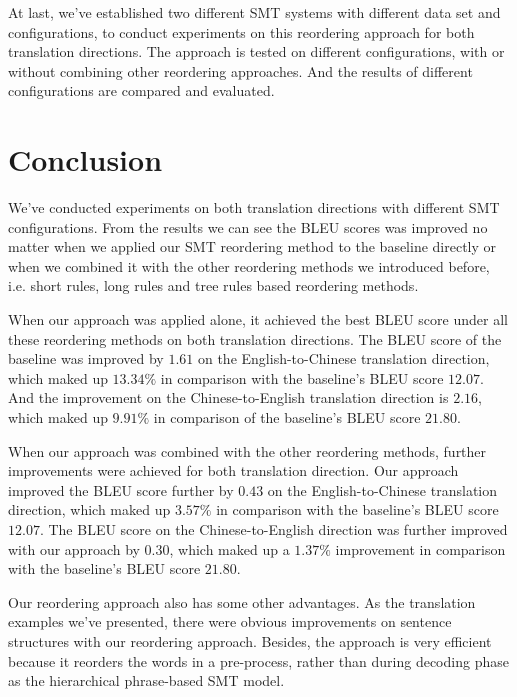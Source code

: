 At last, we've established two different \ac{SMT} systems with different data set and configurations, to conduct experiments on this reordering approach for both translation directions. The approach is tested on different configurations, with or without combining other reordering approaches. And the results of different configurations are compared and evaluated.

\section{Conclusion}
\label{ch:Discussion:sec:Conclusion}

We've conducted experiments on both translation directions with different \ac{SMT} configurations. From the results we can see the \ac{BLEU} scores was improved no matter when we applied our \ac{SMT} reordering method to the baseline directly or when we combined it with the other reordering methods we introduced before, i.e. short rules, long rules and tree rules based reordering methods.

When our approach was applied alone, it achieved the best \ac{BLEU} score under all these reordering methods on both translation directions. The \ac{BLEU} score of the baseline was improved by $1.61$ on the English-to-Chinese translation direction, which maked up $13.34\%$ in comparison with the baseline's \ac{BLEU} score $12.07$. And the improvement on the Chinese-to-English translation direction is $2.16$, which maked up $9.91\%$ in comparison of the baseline's \ac{BLEU} score $21.80$.

When our approach was combined with the other reordering methods, further improvements were achieved for both translation direction. Our approach improved the \ac{BLEU} score further by $0.43$ on the English-to-Chinese translation direction, which maked up $3.57\%$ in comparison with the baseline's \ac{BLEU} score $12.07$. The \ac{BLEU} score on the Chinese-to-English direction was further improved with our approach by $0.30$, which maked up a $1.37\%$ improvement in comparison with the baseline's \ac{BLEU} score $21.80$.

Our reordering approach also has some other advantages. As the translation examples we've presented, there were obvious improvements on sentence structures with our reordering approach. Besides, the approach is very efficient because it reorders the words in a pre-process, rather than during decoding phase as the hierarchical phrase-based SMT model. 

